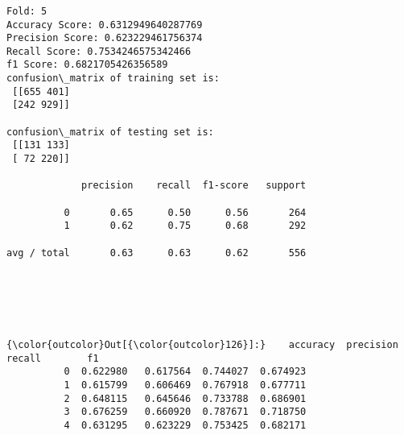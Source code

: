 \documentclass[11pt]{article}
\begin{document}
    \begin{center}
    \end{center}
    { \hspace*{\fill} \\}
    
    \begin{center}
    \end{center}
    { \hspace*{\fill} \\}
    
    \begin{Verbatim}[commandchars=\\\{\}]

Fold: 5
Accuracy Score: 0.6312949640287769
Precision Score: 0.623229461756374
Recall Score: 0.7534246575342466
f1 Score: 0.6821705426356589
confusion\_matrix of training set is: 
 [[655 401]
 [242 929]] 

confusion\_matrix of testing set is: 
 [[131 133]
 [ 72 220]] 

             precision    recall  f1-score   support

          0       0.65      0.50      0.56       264
          1       0.62      0.75      0.68       292

avg / total       0.63      0.63      0.62       556


    \end{Verbatim}

    \begin{center}
    \end{center}
    { \hspace*{\fill} \\}
    
    \begin{center}
    \end{center}
    { \hspace*{\fill} \\}
    
\begin{Verbatim}[commandchars=\\\{\}]
{\color{outcolor}Out[{\color{outcolor}126}]:}    accuracy  precision    recall        f1
          0  0.622980   0.617564  0.744027  0.674923
          1  0.615799   0.606469  0.767918  0.677711
          2  0.648115   0.645646  0.733788  0.686901
          3  0.676259   0.660920  0.787671  0.718750
          4  0.631295   0.623229  0.753425  0.682171
\end{Verbatim}
            
\end{document}

